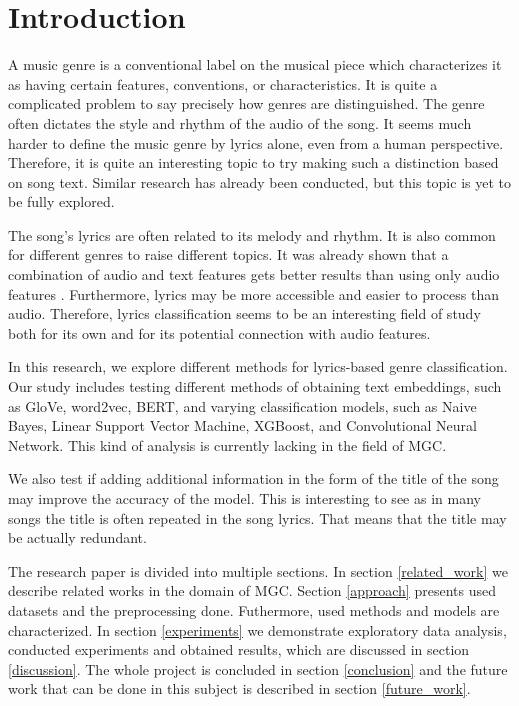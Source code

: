 \section{Introduction}
A music genre is a conventional label on the musical piece which characterizes it as having certain features, conventions, or characteristics. It is quite a complicated problem to say precisely how genres are distinguished. The genre often dictates the style and rhythm of the audio of the song. It seems much harder to define the music genre by lyrics alone, even from a human perspective. Therefore, it is quite an interesting topic to try making such a distinction based on song text. Similar research has already been conducted, but this topic is yet to be fully explored.

The song's lyrics are often related to its melody and rhythm. It is also common for different genres to raise different topics. It was already shown that a combination of audio and text features gets better results than using only audio features \cite{mayer2011Ref}. Furthermore, lyrics may be more accessible and easier to process than audio. Therefore, lyrics classification seems to be an interesting field of study both for its own and for its potential connection with audio features.

In this research, we explore different methods for lyrics-based genre classification. Our study includes testing different methods of obtaining text embeddings, such as GloVe, word2vec, BERT, and varying classification models, such as Naive Bayes, Linear Support Vector Machine, XGBoost, and Convolutional Neural Network. This kind of analysis is currently lacking in the field of MGC.

We also test if adding additional information in the form of the title of the song may improve the accuracy of the model. This is interesting to see as in many songs the title is often repeated in the song lyrics. That means that the title may be actually redundant.

The research paper is divided into multiple sections. In section \ref{related_work} we describe related works in the domain of MGC. Section \ref{approach} presents used datasets and the preprocessing done. Futhermore, used methods and models are characterized. In section \ref{experiments} we demonstrate exploratory data analysis, conducted experiments and obtained results, which are discussed in section \ref{discussion}. The whole project is concluded in section \ref{conclusion} and the future work that can be done in this subject is described in section \ref{future_work}.
